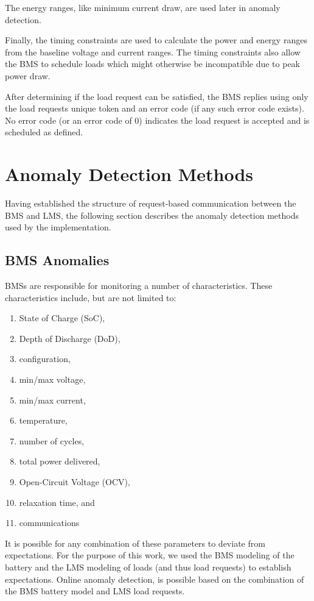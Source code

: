 \documentclass[11pt,conference,draftcls,onecolumn]{IEEEtran}
\begin{document}
The energy ranges, like minimum current draw, are used later in anomaly detection.

Finally, the timing constraints are used to calculate the power and energy ranges from the baseline voltage and current ranges.
The timing constraints also allow the BMS to schedule loads which might otherwise be incompatible due to peak power draw.

After determining if the load request can be satisfied, the BMS replies using only the load requests unique token and an error code (if any such error code exists).
No error code (or an error code of 0) indicates the load request is accepted and is scheduled as defined.

\section{Anomaly Detection Methods}\label{sec:anomalyDetection}
Having established the structure of request-based communication between the BMS and LMS, the following section describes the anomaly detection methods used by the implementation.

\subsection{BMS Anomalies}
BMSs are responsible for monitoring a number of characteristics. These characteristics include, but are not limited to:
\begin{enumerate}
    \item State of Charge (SoC),
    \item Depth of Discharge (DoD),
    \item configuration,
    \item min/max voltage,
    \item min/max current,
    \item temperature,
    \item number of cycles,
    \item total power delivered,
    \item Open-Circuit Voltage (OCV),
    \item relaxation time, and
    \item communications
\end{enumerate}

It is possible for any combination of these parameters to deviate from expectations.
For the purpose of this work, we used the BMS modeling of the battery and the LMS modeling of loads (and thus load requests) to establish expectations.
Online anomaly detection, is possible based on the combination of the BMS battery model and LMS load requests.
\end{document}
